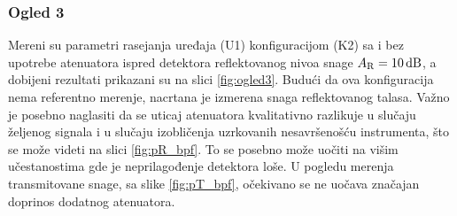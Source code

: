 \documentclass[a4paper, 12pt, diplomski]{etf}
\renewcommand{\unit}[1]{\,{\rm #1}}   %
\begin{document}
\subsubsection{Ogled 3}
Mereni su parametri rasejanja uređaja (U1) 
konfiguracijom (K2) sa i bez upotrebe atenuatora  
ispred detektora reflektovanog nivoa snage
$A_{\rm R} = 10\unit{dB}$, a dobijeni rezultati 
prikazani su na slici \ref{fig:ogled3}. 
Budući da ova konfiguracija nema referentno
merenje, nacrtana je izmerena snaga reflektovanog
talasa. Važno je posebno naglasiti da se 
uticaj atenuatora kvalitativno razlikuje u 
slučaju željenog signala i u slučaju izobličenja
uzrkovanih nesavršenošću instrumenta, što se 
može videti na slici \ref{fig:pR_bpf}. To se 
posebno može uočiti na višim učestanostima 
gde je neprilagođenje detektora loše. 
U pogledu merenja transmitovane snage,
sa slike \ref{fig:pT_bpf}, očekivano se ne uočava
značajan doprinos dodatnog atenuatora.
\end{document}
